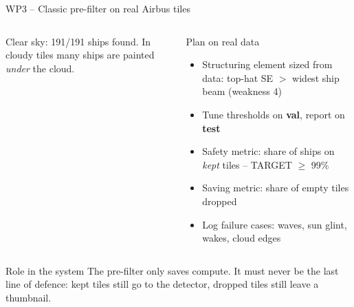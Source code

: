 \documentclass[aspectratio=169,10pt]{beamer}
\newcommand{\SIMtag}{\textcolor{ocean}{\textbf{[SIM]}}}
\begin{document}
\begin{frame}{WP3 -- Classic pre-filter on real Airbus tiles}
\begin{columns}[T]
{\scriptsize Clear sky: 191/191 ships found. In cloudy tiles many ships are painted \emph{under} the cloud.}
\begin{block}{Plan on real data}
\footnotesize
\begin{itemize}
  \item Structuring element sized from data: top-hat SE $>$ widest ship beam (weakness 4)
  \item Tune thresholds on \textbf{val}, report on \textbf{test}
  \item Safety metric: share of ships on \emph{kept} tiles -- TARGET $\geq$ 99\%
  \item Saving metric: share of empty tiles dropped
  \item Log failure cases: waves, sun glint, wakes, cloud edges
\end{itemize}
\end{block}
\end{columns}
\vspace{1mm}
\begin{alertblock}{Role in the system}
\footnotesize The pre-filter only saves compute. It must never be the last line of defence: kept tiles still go to the detector, dropped tiles still leave a thumbnail.
\end{alertblock}
\end{frame}
\end{document}
